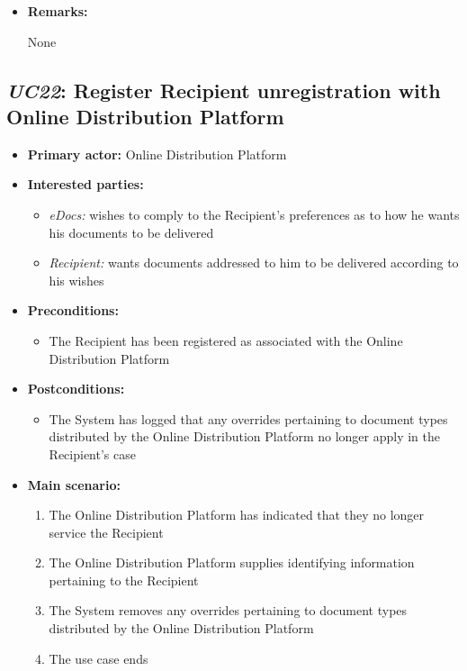 \documentclass[a4paper,10pt]{article}
\begin{document}
\begin{itemize}
	\item \textbf{Remarks:}
	\begin{itemize}
		None
	\end{itemize}
\end{itemize}

\subsection{\emph{UC22}: Register Recipient unregistration with Online Distribution Platform}
\begin{itemize}
	\item \textbf{Primary actor:} Online Distribution Platform
	\item \textbf{Interested parties:} 
	\begin{itemize}
		\item \textit{eDocs:} wishes to comply to the Recipient's preferences as to how he wants his documents to be delivered
		\item \textit{Recipient:} wants documents addressed to him to be delivered according to his wishes
	\end{itemize}
	
	\item \textbf{Preconditions:}
	\begin{itemize}
		\item The Recipient has been registered as associated with the Online Distribution Platform
	\end{itemize}
	
	\item \textbf{Postconditions:}
	\begin{itemize}
		\item The System has logged that any overrides pertaining to document types distributed by the Online Distribution Platform no longer apply in the Recipient's case
	\end{itemize}
	
	\item \textbf{Main scenario:} 
	\begin{enumerate}
		\item The Online Distribution Platform has indicated that they no longer service the Recipient
		\item The Online Distribution Platform supplies identifying information pertaining to the Recipient
		\item The System removes any overrides pertaining to document types distributed by the Online Distribution Platform
		\item The use case ends
	\end{enumerate}
	

\end{itemize}
\end{document}

